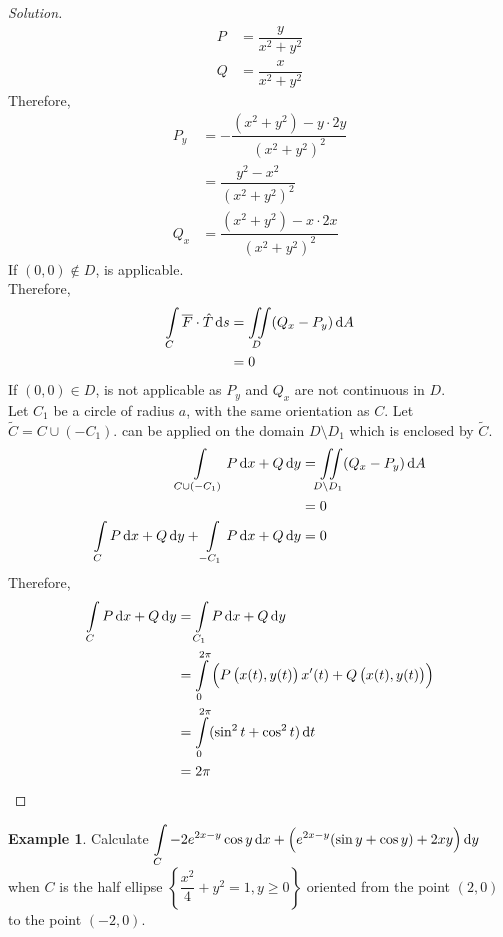 \documentclass[fleqn, a4paper, 12pt]{article}
\theoremstyle{definition}
\newtheorem{example}{Example}
\theoremstyle{theorem}
\theoremstyle{remark}
\newenvironment{solution}
{\begin{proof}[Solution]\let\qed\relax}
	{\end{proof}}
\begin{document}
\begin{solution}
	\begin{align*}
		P &= \dfrac{y}{x^2 + y^2}\\
		Q &= \dfrac{x}{x^2 + y^2}
	\end{align*}
	Therefore,
	\begin{align*}
		P_y &= -\dfrac{(x^2 + y^2) - y \cdot 2y}{(x^2 + y^2)^2}\\
		&= \dfrac{y^2 - x^2}{(x^2 + y^2)^2}\\
		Q_x &= \dfrac{(x^2 + y^2) - x \cdot 2x}{(x^2 + y^2)^2}
	\end{align*}
	If $(0,0) \notin D$,  is applicable.\\
	Therefore,
	\begin{align*}
		\int\limits_{C} \overline{F} \cdot \hat{T} \dif s &= \iint\limits_{D} (Q_x - P_y) \dif A\\
		&= 0
	\end{align*}
	If $(0,0) \in D$,  is not applicable as $P_y$ and $Q_x$ are not continuous in $D$.\\
	Let $C_1$ be a circle of radius $a$, with the same orientation as $C$. Let $\widetilde{C} = C \cup (-C_1)$.  can be applied on the domain $D \setminus D_1$ which is enclosed by $\widetilde{C}$.
	\begin{align*}
		\int\limits_{C \cup (-C_1)} P \dif x + Q \dif y &= \iint\limits_{D \setminus D_1} (Q_x - P_y) \dif A\\
		&= 0\\
		\int\limits_{C} P \dif x + Q \dif y + \int\limits_{-C_1} P \dif x + Q \dif y &= 0
	\end{align*}
	Therefore,
	\begin{align*}
		\int\limits_{C} P \dif x + Q \dif y &= \int\limits_{C_1} P \dif x + Q \dif y\\
		&= \int\limits_{0}^{2 \pi} \left( P\left( x(t), y(t) \right) x'(t) + Q\left( x(t), y(t) \right) \right)\\
		&= \int\limits_{0}^{2 \pi} (\sin^2 t + \cos^2 t) \dif t\\
		&= 2 \pi
	\end{align*}
\end{solution}

\begin{example}
	Calculate $\displaystyle \int\limits_{C} -2e^{2x - y} \cos y \dif x + \left( e^{2x - y} (\sin y + \cos y) + 2xy \right) \dif y$ when $C$ is the half ellipse $\left\lbrace \dfrac{x^2}{4} + y^2 = 1, y \geq 0 \right\rbrace$ oriented from the point $(2,0)$ to the point $(-2,0)$.
\end{example}
\end{document}
